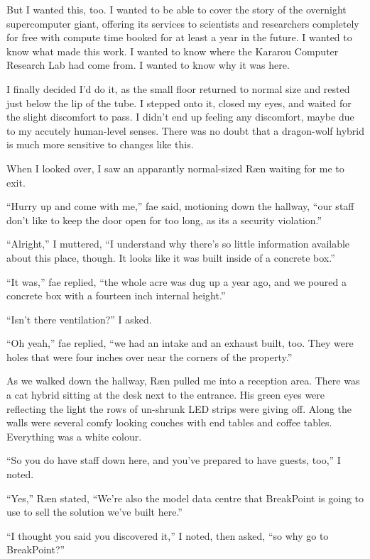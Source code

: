 But I wanted this, too.  I wanted to be able to cover the story of the overnight supercomputer giant, offering its services to scientists and researchers completely for free with compute time booked for at least a year in the future.  I wanted to know what made this work.  I wanted to know where the Kararou Computer Research Lab had come from.  I wanted to know why it was here.

I finally decided I'd do it, as the small floor returned to normal size and rested just below the lip of the tube.  I stepped onto it, closed my eyes, and waited for the slight discomfort to pass.  I didn't end up feeling any discomfort, maybe due to my accutely human-level senses.  There was no doubt that a dragon-wolf hybrid is much more sensitive to changes like this.

When I looked over, I saw an apparantly normal-sized Ræn waiting for me to exit.

``Hurry up and come with me,'' fae said, motioning down the hallway, ``our staff don't like to keep the door open for too long, as its a security violation.''

``Alright,'' I muttered, ``I understand why there's so little information available about this place, though.  It looks like it was built inside of a concrete box.''

``It was,'' fae replied, ``the whole acre was dug up a year ago, and we poured a concrete box with a fourteen inch internal height.''

``Isn't there ventilation?'' I asked.

``Oh yeah,'' fae replied, ``we had an intake and an exhaust built, too.  They were holes that were four inches over near the corners of the property.''

As we walked down the hallway, Ræn pulled me into a reception area.  There was a cat hybrid sitting at the desk next to the entrance.  His green eyes were reflecting the light the rows of un-shrunk LED strips were giving off.  Along the walls were several comfy looking couches with end tables and coffee tables.  Everything was a white colour.

``So you do have staff down here, and you've prepared to have guests, too,'' I noted.

``Yes,'' Ræn stated, ``We're also the model data centre that BreakPoint is going to use to sell the solution we've built here.''

``I thought you said you discovered it,'' I noted, then asked, ``so why go to BreakPoint?''

